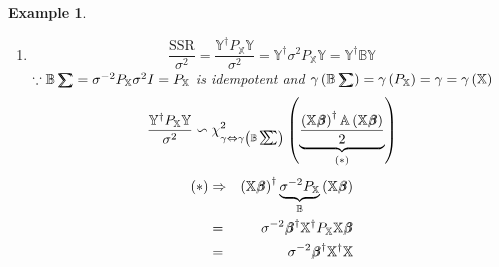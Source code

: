 \documentclass{article}
\newtheorem{example}[theorem]{Example}
\begin{document}
\begin{example}
\begin{enumerate}
\item 
\begin{equation*}
\frac{\text{SSR}}{\sigma ^{2}}=\frac{\mathbb{Y}^{\dagger }P_{\mathbb{X}}%
\mathbb{Y}}{\sigma ^{2}}=\mathbb{Y}^{\dagger }\sigma ^{2}P_{\mathbb{X}}%
\mathbb{Y=Y}^{\dagger }\mathbb{BY}
\end{equation*}%
$\because \mathbb{B}%
\tsum\mkern-20mu\tsum%
=\sigma ^{-2}P_{\mathbb{X}}\sigma ^{2}I=P_{\mathbb{X}}$ is idempotent and $%
\gamma \left( \mathbb{B}%
\tsum\mkern-20mu\tsum%
\right) =\gamma \left( P_{\mathbb{X}}\right) =\gamma =\gamma \left( \mathbb{X%
}\right) $%
\begin{equation*}
\therefore \frac{\mathbb{Y}^{\dagger }P_{\mathbb{X}}\mathbb{Y}}{\sigma ^{2}}%
\backsim \chi _{\gamma \Leftrightarrow \gamma \left( \mathbb{B}%
\tsum\mkern-20mu\tsum%
\right) }^{2}\left( \underset{\left( \ast \right) }{\underbrace{\frac{\left( 
\mathbb{X}%
\beta\mkern-9.6mu \beta%
\right) ^{\dagger }\mathbb{A}\left( \mathbb{X}%
\beta\mkern-9.6mu \beta%
\right) }{2}}}\right) 
\end{equation*}%
\begin{eqnarray*}
\left( \ast \right)  &\Rightarrow &\left( \mathbb{X}%
\beta\mkern-9.6mu \beta%
\right) ^{\dagger }\underset{\mathbb{B}}{\underbrace{\sigma ^{-2}P_{\mathbb{X%
}}}}\left( \mathbb{X}%
\beta\mkern-9.6mu \beta%
\right)  \\
&=&\sigma ^{-2}%
\beta\mkern-9.6mu \beta%
^{\dagger }\mathbb{X}^{\dagger }P_{\mathbb{X}}\mathbb{X}%
\beta\mkern-9.6mu \beta
\\
&=&\sigma ^{-2}%
\beta\mkern-9.6mu \beta%
^{\dagger }\mathbb{X}^{\dagger }\mathbb{X}%

\end{eqnarray*}
\end{enumerate}
\end{example}
\end{document}
